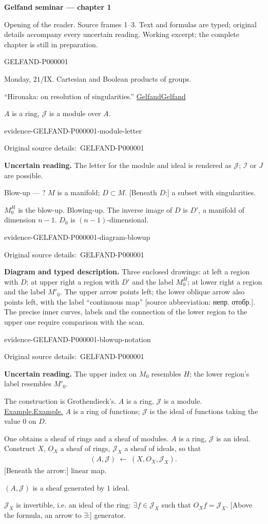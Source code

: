 \documentclass[11pt]{article}
\let\MathUnderline\underline
\renewcommand{\underline}[1]{\ifmmode\MathUnderline{#1}\else\uline{#1}\fi}
\newcommand{\SourcePage}[2]{\par\smallskip\phantomsection\label{#1:source-page}{\small\sffamily\color{blue!55!black}#1}\par\smallskip}
\newcommand{\EvidenceBlock}[4]{%
 \par\smallskip\noindent\begin{minipage}{\linewidth}
 \begin{minipage}[t]{.47\linewidth}\vspace{0pt}\centering
 \csname evidence-#1-#2\endcsname\par
 {\scriptsize\SourceCropCaption\ #1}\par
 \end{minipage}\hfill
 \begin{minipage}[t]{.49\linewidth}\vspace{0pt}\raggedright
 {\small\color{orange!65!black}\textbf{#4} #3}\par
 \end{minipage}
 \end{minipage}\par\smallskip}
\newcommand{\Unclear}[3]{\EvidenceBlock{#1}{#2}{#3}{\ReadingCaption}}
\newcommand{\SourceFigure}[3]{\EvidenceBlock{#1}{#2}{#3}{\DiagramCaption}}
\newcommand{\SourceCropCaption}{Original source details:}\newcommand{\ReadingCaption}{Uncertain reading.}\newcommand{\IncompleteCaption}{Undeciphered passage.}\newcommand{\DiagramCaption}{Diagram and typed description.}
\begin{document}
{\large\bfseries Gelfand seminar — chapter 1}\par
{\small Opening of the reader. Source frames 1–3. Text and formulas are typed; original details accompany every uncertain reading. Working excerpt; the complete chapter is still in preparation.}\par\medskip
\SourcePage{GELFAND-P000001}{unlabelled}
Monday, $21/\mathrm{IX}$.
Cartesian and Boolean products of groups.

``Hironaka: on resolution of singularities.''
\underline{Gelfand}

$A$ is a ring, $\mathcal{J}$ is a module over $A$.
\Unclear{GELFAND-P000001}{module-letter}{The letter for the module and ideal is rendered as $\mathcal{J}$; $\mathcal{I}$ or $J$ are possible.}

Blow-up --- ?
$M$ is a manifold; $D\subset M$.
[Beneath $D$:] a subset with singularities.

$M_0^H$ is the blow-up. Blowing-up.
The inverse image of $D$ is $D'$, a manifold of dimension $n-1$.
$D_0$ is $(n-1)$-dimensional.
\SourceFigure{GELFAND-P000001}{diagram-blowup}{Three enclosed drawings: at left a region with $D$; at upper right a region with $D'$ and the label $M_0^H$; at lower right a region and the label $M'_0$. The upper arrow points left; the lower oblique arrow also points left, with the label ``continuous map'' [source abbreviation: непр. отобр.]. The precise inner curves, labels and the connection of the lower region to the upper one require comparison with the scan.}
\Unclear{GELFAND-P000001}{blowup-notation}{The upper index on $M_0$ resembles $H$; the lower region's label resembles $M'_0$.}

The construction is Grothendieck's.
$A$ is a ring, $\mathcal{J}$ is a module.
\underline{Example.} $A$ is a ring of functions;
$\mathcal{J}$ is the ideal of functions taking the value $0$ on $D$.

One obtains a sheaf of rings and a sheaf of modules.
$A$ is a ring, $\mathcal{J}$ is an ideal.
Construct $X$, $O_X$ a sheaf of rings,
$\mathcal{J}_X$ a sheaf of ideals, so that
\begin{gather*}
 (A,\mathcal{J})\ \longleftarrow\ (X,O_X,\mathcal{J}_X).
\end{gather*}
[Beneath the arrow:] linear map.

$(A,\mathcal{J})$ is a sheaf generated by $1$ ideal.

$\mathcal{J}_X$ is invertible, i.e. an ideal of the ring:
$\exists f\in\mathcal{J}_X$ such that $O_Xf=\mathcal{J}_X$.
[Above the formula, an arrow to $\exists$:] generator.
\end{document}
